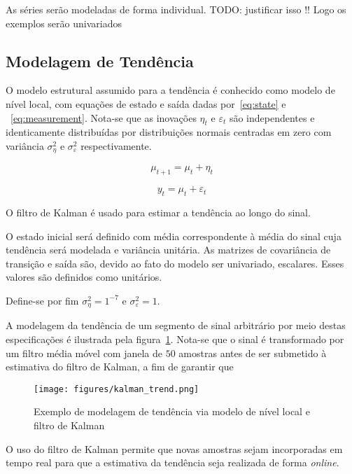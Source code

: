 As séries serão modeladas de forma individual. TODO: justificar isso !!
Logo os exemplos serão univariados

\subsection{Modelagem de Tendência}

O modelo estrutural assumido para a tendência é conhecido como modelo de nível
local, com equações de estado e saída dadas por~\ref{eq:state} e
~\ref{eq:measurement}. Nota-se que as inovações $\eta_t$ e $\varepsilon_t$ são
independentes e identicamente distribuídas por distribuições normais centradas
em zero com variância $\sigma^2_{\eta}$ e $\sigma^2_{\varepsilon}$
respectivamente.

\begin{equation}\label{eq:state}
    \mu_{t+1} = \mu_t + \eta_t
\end{equation}

\begin{equation}\label{eq:measurement}
    y_t = \mu_t + \varepsilon_t
\end{equation}

O filtro de Kalman é usado para estimar a tendência ao longo do sinal.

O estado inicial será definido com média correspondente à média do sinal cuja
tendência será modelada e variância unitária. As matrizes de covariância de
transição e saída são, devido ao fato do modelo ser univariado, escalares.
Esses valores são definidos como unitários.

Define-se por fim $\sigma^2_{\eta} = 1^{-7}$ e $\sigma^2_{\varepsilon} = 1$.

A modelagem da tendência de um segmento de sinal arbitrário por meio destas
especificações é ilustrada pela figura~\ref{fig:kalman_trend}. Nota-se
que o sinal é transformado por um filtro média móvel com janela de $50$
amostras antes de ser submetido à estimativa do filtro de Kalman, a fim de
garantir que

\begin{figure}[H]
    \centering
    \texttt{[image: figures/kalman\_trend.png]}
    \caption{Exemplo de modelagem de tendência via modelo de nível local e
    filtro de Kalman}
    \label{fig:kalman_trend}
\end{figure}

O uso do filtro de Kalman permite que novas amostras sejam incorporadas em
tempo real para que a estimativa da tendência seja realizada de forma
\emph{online}.

